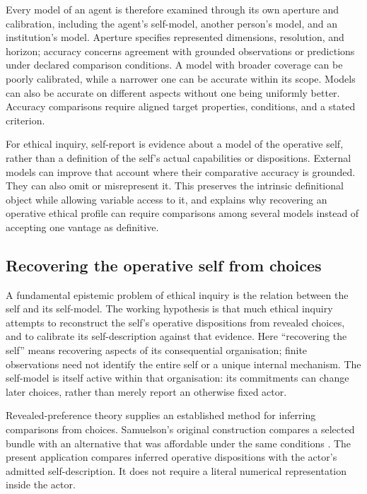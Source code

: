 \documentclass[11pt,a4paper]{article}
\theoremstyle{remark}
\begin{document}
Every model of an agent is therefore examined through its own aperture and
calibration, including the agent's self-model, another person's model, and an
institution's model. Aperture specifies represented dimensions, resolution,
and horizon; accuracy concerns agreement with grounded observations or
predictions under declared comparison conditions. A model with broader coverage
can be poorly calibrated, while a narrower one can be accurate within its
scope. Models can also be accurate on different aspects without one being
uniformly better. Accuracy comparisons require aligned target properties,
conditions, and a stated criterion.

For ethical inquiry, self-report is evidence about a model of the operative
self, rather than a definition of the self's actual capabilities or dispositions.
External models can improve that account where their comparative accuracy is
grounded. They can also omit or misrepresent it. This preserves the intrinsic
definitional object while allowing variable access to it, and explains why
recovering an operative ethical profile can require comparisons among several
models instead of accepting one vantage as definitive.

\subsection{Recovering the operative self from choices}

A fundamental epistemic problem of ethical inquiry is the relation between the
self and its self-model. The working hypothesis is that much ethical inquiry
attempts to reconstruct the self's operative dispositions from revealed choices,
and to calibrate its self-description against that evidence. Here ``recovering
the self'' means recovering aspects of its consequential organisation; finite
observations need not identify the entire self or a unique internal mechanism.
The self-model is itself active within that organisation: its commitments can
change later choices, rather than merely report an otherwise fixed actor.

Revealed-preference theory supplies an established method for inferring
comparisons from choices. Samuelson's original construction compares a selected
bundle with an alternative that was affordable under the same conditions
\citep{samuelson1938behaviour}. The present application compares inferred operative
dispositions with the actor's admitted self-description. It does not require a
literal numerical representation inside the actor.
\end{document}
